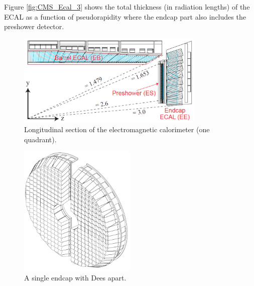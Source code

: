 Figure \ref{fig:CMS_Ecal_3} shows the total thickness (in radiation lengths) of the ECAL as a function of
pseudorapidity where the endcap part also includes the preshower detector.


\begin{figure}[h!]
\begin{center}
\includegraphics[width=0.8\textwidth]{figures/CMS/ECAL/Ecal_layout.png}
\caption{Longitudinal section of the electromagnetic calorimeter (one quadrant).}
\label{fig:CMS_Ecal_2}
\end{center}
\end{figure}

\begin{figure}[h!]
\begin{center}
\includegraphics[width=0.5\textwidth]{figures/CMS/ECAL/cms_ecalEndcap.png}
\caption{A single endcap with Dees apart.}
\label{fig:CMS_Ecal_endcap}
\end{center}
\end{figure}

